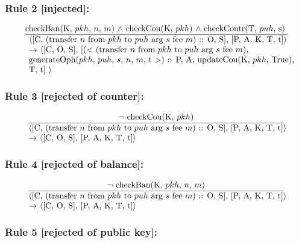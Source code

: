 \documentclass[a4paper]{llncs}
\begin{document}
\subsubsection*{Rule 2 [injected]:}

\begin{equation}{}
\frac{\text{checkBan(K, $pkh$, $n$, $m$) $\wedge$ checkCou(K, $pkh$) $\wedge$ checkContr(T, $puh$, s) }}{\parbox{4.2in}{\text{$\langle$[C, (transfer ${n}$ from ${pkh}$ to  ${puh}$ arg ${s}$ fee ${m}$) :: O, S], [P, A, K, T, t]$\rangle$}\\
\text{$\rightarrow$  $\langle$[C, O, S], [($<$ (transfer ${n}$ from ${pkh}$ to  ${puh}$ arg ${s}$ fee ${m}$), }\\
 \text{generateOph($pkh$, $puh$, $s$, $n$, $m$, t $>$) :: P, A, updateCou(K, $pkh$, True), }\\
\text{T, t] $\rangle$}}} 
\end{equation}

\subsubsection*{Rule 3 [rejected of counter]:}

\begin{equation}{}
\frac{\text{$\neg$ checkCou(K, $pkh$)}}{\parbox{4.2in}{\text{$\langle$[C, (transfer ${n}$ from ${pkh}$ to  ${puh}$ arg ${s}$ fee ${m}$) :: O, S], [P, A, K, T, t]$\rangle$  }\\
\text{$\rightarrow$ $\langle$[C, O, S], [P, A, K, T, t]$\rangle$}}} 
\end{equation}

\subsubsection*{Rule 4 [rejected of balance]:}

\begin{equation}{}
\frac{\text{$\neg$ checkBan(K, $pkh$, $n$, $m$)}}{\parbox{4.2in}{\text{$\langle$[C, (transfer ${n}$ from ${pkh}$ to  ${puh}$ arg ${s}$ fee ${m}$) :: O, S], [P, A, K, T, t]$\rangle$ }\\
\text{$\rightarrow$ $\langle$[C, O, S], [P, A, K, T, t]$\rangle$}}} 
\end{equation}

\subsubsection*{Rule 5 [rejected of public key]:}
\end{document}
